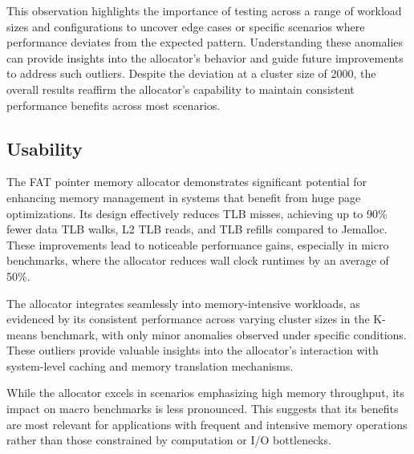 \documentclass[11pt]{article}
\begin{document}
This observation highlights the importance of testing across a range of workload sizes and 
configurations to uncover edge cases or specific scenarios where performance deviates from the 
expected pattern. Understanding these anomalies can provide insights into the allocator's 
behavior and guide future improvements to address such outliers. Despite the deviation at a 
cluster size of 2000, the overall results reaffirm the allocator's capability to maintain 
consistent performance benefits across most scenarios.
\subsection{Usability}
\label{sec:orgb046e55}
The FAT pointer memory allocator demonstrates significant potential for enhancing 
memory management in systems that benefit from huge page optimizations. Its design 
effectively reduces TLB misses, achieving up to 90\% fewer data TLB walks, L2 TLB reads, 
and TLB refills compared to Jemalloc. These improvements lead to noticeable performance 
gains, especially in micro benchmarks, where the allocator reduces wall clock runtimes 
by an average of 50\%.

The allocator integrates seamlessly into memory-intensive workloads, as evidenced by its 
consistent performance across varying cluster sizes in the K-means benchmark, with only 
minor anomalies observed under specific conditions. These outliers provide valuable 
insights into the allocator's interaction with system-level caching and memory translation mechanisms.

While the allocator excels in scenarios emphasizing high memory throughput, its impact on 
macro benchmarks is less pronounced. This suggests that its benefits are most relevant for 
applications with frequent and intensive memory operations rather than those constrained by 
computation or I/O bottlenecks.



\end{document}
